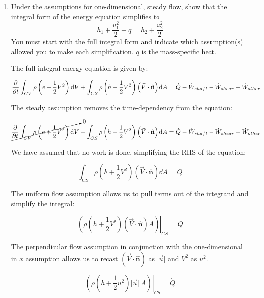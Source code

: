 \documentclass[../main.tex]{subfiles}
\begin{document}
\begin{enumerate}[label = (\alph*)]
    \item
        Under the assumptions for one-dimensional, steady flow, show that the integral form of the energy equation simplifies to
        \[
            h_1 + \frac{u_1^2}{2} + q = h_2 + \frac{u_2^2}{2}  
        \]
        You must start with the full integral form and indicate which assumption(s) allowed you to make each simplification.
        $q$ is the mass-specific heat.

        The full integral energy equation is given by:

        \[
            \pdv{t} \int_{CV} \rho \left({e+\frac{1}{2}V^2}\right) \dd \volume +%
            \int_{CS} \rho \left({h + \frac{1}{2}V^2 }\right) \left({\vec{V} \cdot \hat{\mathbf{n}}}\right) \dd A =%
            \dot{Q} - \dot{W}_{shaft} - \dot{W}_{shear} - \dot{W}_{other}\\  
        \]

        The steady assumption removes the time-dependency from the equation:

        \[
            \cancelto{0}{\pdv{t} \int_{CV} \rho \left({e+\frac{1}{2}V^2}\right) \dd \volume} +%
            \int_{CS} \rho \left({h + \frac{1}{2}V^2 }\right) \left({\vec{V} \cdot \hat{\mathbf{n}}}\right) \dd A =%
            \dot{Q} - \dot{W}_{shaft} - \dot{W}_{shear} - \dot{W}_{other}\\  
        \]

        We have assumed that no work is done, simplifying the RHS of the equation:
        
        \[
            \int_{CS} \rho \left({h + \frac{1}{2}V^2 }\right) \left({\vec{V} \cdot \hat{\mathbf{n}}}\right) \dd A =%
            \dot{Q}  
        \]

        The uniform flow assumption allows us to pull terms out of the integrand and simplify the integral:

        \[
            \left.\left(\rho \left({h + \frac{1}{2}V^2 }\right) \left({\vec{V} \cdot \hat{\mathbf{n}}}\right) A\right)\right|_{CS} =%
            \dot{Q}  
        \]

        The perpendicular flow assumption in conjunction with the one-dimensional in \(x\) assumption allows us to recast  \(\left({\vec{V} \cdot \hat{\mathbf{n}}}\right)\) as \(\lvert\vec{u}\rvert\) and \(V^2\) as \(u^2\).

        \[
            \left.\left(\rho \left({h + \frac{1}{2}u^2 }\right) \lvert\vec{u}\rvert\ A\right)\right|_{CS} =%
            \dot{Q}  
        \]


\end{enumerate}
\end{document}
